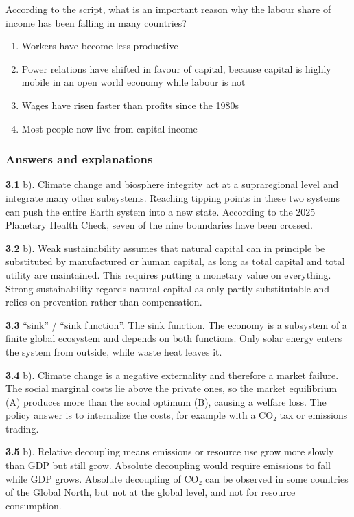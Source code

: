 \documentclass[
  british,
  a4paper,
  DIV=11,
  numbers=noendperiod,
  oneside,
  openany]{scrreprt}
\providecommand{\tightlist}{%
  \setlength{\itemsep}{0pt}\setlength{\parskip}{0pt}}
\begin{document}
According to the script, what is an important reason why the labour
share of income has been falling in many countries?

\begin{enumerate}
\def\labelenumi{\alph{enumi})}
\tightlist
\item
  Workers have become less productive
\item
  Power relations have shifted in favour of capital, because capital is
  highly mobile in an open world economy while labour is not
\item
  Wages have risen faster than profits since the 1980s
\item
  Most people now live from capital income
\end{enumerate}

\subsubsection*{Answers and
explanations}\label{answers-and-explanations-2}

\textbf{3.1} b). Climate change and biosphere integrity act at a
supraregional level and integrate many other subsystems. Reaching
tipping points in these two systems can push the entire Earth system
into a new state. According to the 2025 Planetary Health Check, seven of
the nine boundaries have been crossed.

\textbf{3.2} b). Weak sustainability assumes that natural capital can in
principle be substituted by manufactured or human capital, as long as
total capital and total utility are maintained. This requires putting a
monetary value on everything. Strong sustainability regards natural
capital as only partly substitutable and relies on prevention rather
than compensation.

\textbf{3.3} ``sink'' / ``sink function''. The sink function. The
economy is a subsystem of a finite global ecosystem and depends on both
functions. Only solar energy enters the system from outside, while waste
heat leaves it.

\textbf{3.4} b). Climate change is a negative externality and therefore
a market failure. The social marginal costs lie above the private ones,
so the market equilibrium (A) produces more than the social optimum (B),
causing a welfare loss. The policy answer is to internalize the costs,
for example with a CO₂ tax or emissions trading.

\textbf{3.5} b). Relative decoupling means emissions or resource use
grow more slowly than GDP but still grow. Absolute decoupling would
require emissions to fall while GDP grows. Absolute decoupling of CO₂
can be observed in some countries of the Global North, but not at the
global level, and not for resource consumption.
\end{document}
